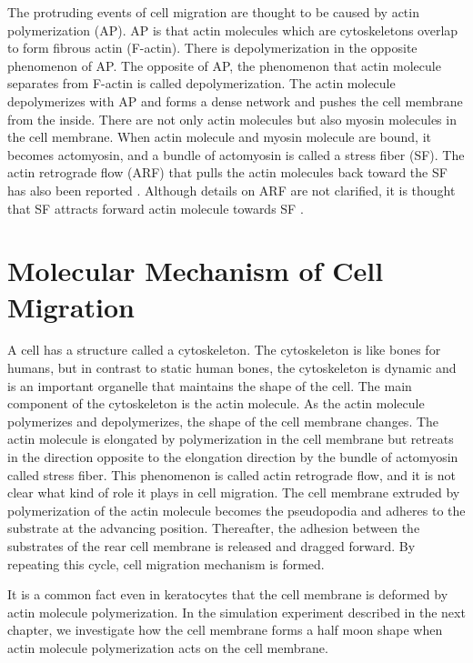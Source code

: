 \documentclass[a4paper,12pt]{book}
\begin{document}
The protruding events of cell migration are thought to be caused by actin polymerization (AP)\cite{svitkina1997analysis}.
AP is that actin molecules which are cytoskeletons overlap to form fibrous actin (F-actin).
There is depolymerization in the opposite phenomenon of AP.
The opposite of AP, the phenomenon that actin molecule separates from F-actin is called depolymerization.
The actin molecule depolymerizes with AP and forms a dense network and pushes the cell membrane from the inside.
There are not only actin molecules but also myosin molecules in the cell membrane.
When actin molecule and myosin molecule are bound, it becomes actomyosin, and a bundle of actomyosin is called a stress fiber (SF).
The actin retrograde flow (ARF) that pulls the actin molecules back toward the SF has also been reported \cite{swaminathan2017actin}.
Although details on ARF are not clarified, it is thought that SF attracts forward actin molecule towards SF \cite{nakata2016role}.

\section{Molecular Mechanism of Cell Migration}
A cell has a structure called a cytoskeleton. The cytoskeleton is like bones for humans, but in contrast to static human bones, the cytoskeleton is dynamic and is an important organelle that maintains the shape of the cell. The main component of the cytoskeleton is the actin molecule. As the actin molecule polymerizes and depolymerizes, the shape of the cell membrane changes. The actin molecule is elongated by polymerization in the cell membrane but retreats in the direction opposite to the elongation direction by the bundle of actomyosin called stress fiber. This phenomenon is called actin retrograde flow, and it is not clear what kind of role it plays in cell migration. The cell membrane extruded by polymerization of the actin molecule becomes the pseudopodia and adheres to the substrate at the advancing position. Thereafter, the adhesion between the substrates of the rear cell membrane is released and dragged forward. By repeating this cycle, cell migration mechanism is formed.

It is a common fact even in keratocytes that the cell membrane is deformed by actin molecule polymerization. In the simulation experiment described in the next chapter, we investigate how the cell membrane forms a half moon shape when actin molecule polymerization acts on the cell membrane.
\end{document}
